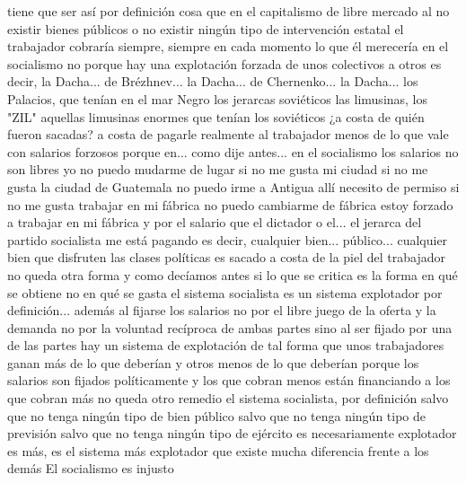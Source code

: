 tiene que ser así por definición cosa que en el capitalismo de libre mercado al no existir bienes públicos
o no existir ningún tipo de intervención estatal el trabajador cobraría siempre, siempre en cada momento lo que él merecería
en el socialismo no porque hay una explotación forzada de unos colectivos a otros es decir, la Dacha...
de Brézhnev... la Dacha... de Chernenko... la Dacha... los Palacios, que tenían en el mar Negro
los jerarcas soviéticos las limusinas, los "ZIL" aquellas limusinas enormes que tenían los soviéticos
¿a costa de quién fueron sacadas? a costa de pagarle realmente al trabajador
menos de lo que vale con salarios forzosos porque en... como dije antes... en el socialismo los salarios no son libres
yo no puedo mudarme de lugar si no me gusta mi ciudad si no me gusta la ciudad de Guatemala no puedo irme a Antigua
allí necesito de permiso si no me gusta trabajar en mi fábrica no puedo cambiarme de fábrica estoy forzado a trabajar en mi fábrica
y por el salario que el dictador o el... el jerarca del partido socialista me está pagando
es decir, cualquier bien... público... cualquier bien que disfruten las clases políticas
es sacado a costa de la piel del trabajador no queda otra forma y como decíamos antes
si lo que se critica es la forma en qué se obtiene no en qué se gasta el sistema socialista es un sistema explotador
por definición... además al fijarse los salarios no por el libre juego de la oferta y la demanda
no por la voluntad recíproca de ambas partes sino al ser fijado por una de las partes
hay un sistema de explotación de tal forma que unos trabajadores ganan más de lo que deberían y otros menos de lo que deberían
porque los salarios son fijados políticamente y los que cobran menos están financiando a los que cobran más
no queda otro remedio el sistema socialista, por definición salvo que no tenga ningún tipo de bien público
salvo que no tenga ningún tipo de previsión salvo que no tenga ningún tipo de ejército es necesariamente explotador
es más, es el sistema más explotador que existe mucha diferencia frente a los demás
El socialismo es injusto

